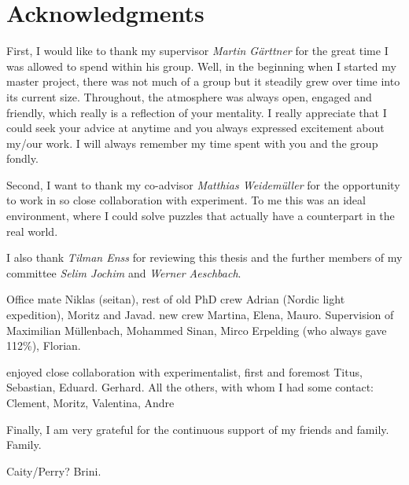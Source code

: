 
\bigskip

\begingroup
\let\clearpage\relax
\let\cleardoublepage\relax
\let\cleardoublepage\relax
\chapter*{Acknowledgments}
First, I would like to thank my supervisor \emph{Martin Gärttner} for the great time I was allowed to spend within his group. Well, in the beginning when I started my master project, there was not much of a group but it steadily grew over time into its current size. Throughout, the atmosphere was always open, engaged and friendly, which really is a reflection of your mentality. I really appreciate that I could seek your advice at anytime and you always expressed excitement about my/our work. I will always remember my time spent with you and the group fondly.

Second, I want to thank my co-advisor \emph{Matthias Weidemüller} for the opportunity to work in so close collaboration with experiment. To me this was an ideal environment, where I could solve puzzles that actually have a counterpart in the real world. %

I also thank \emph{Tilman Enss} for reviewing this thesis and the further members of my committee \emph{Selim Jochim} and \emph{Werner Aeschbach}.


Office mate Niklas (seitan), rest of old PhD crew Adrian (Nordic light expedition), Moritz and Javad. new crew Martina, Elena, Mauro. Supervision of Maximilian Müllenbach, Mohammed Sinan, Mirco Erpelding (who always gave 112\%), Florian.

enjoyed close collaboration with experimentalist, first and foremost Titus, Sebastian, Eduard. Gerhard. All the others, with whom I had some contact: Clement, Moritz, Valentina, Andre


Finally, I am very grateful for the continuous support of my friends and family.
Family. 

Caity/Perry?
Brini.
\endgroup

